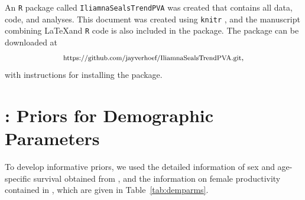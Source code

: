 \documentclass[]{risa}\usepackage[]{graphicx}\usepackage[]{color}
\begin{document}
 An \texttt{R} \citep{R:Deve:Core:ALan:2017} package called \texttt{IliamnaSealsTrendPVA} was created that contains all data, code, and analyses. This document was created using \texttt{knitr} \citep{Yihu:impl:2014,Yihu:dyna:2015,Yihu:knit:2016}, and the manuscript combining \LaTeX and \texttt{R} code is also included in the package. The package can be downloaded at 
 \[
 \footnotesize
 \textrm{https://github.com/jayverhoef/IliamnaSealsTrendPVA.git},
 \] 
 with instructions for installing the package.






\appendix

\section{:\hspace{2pt} Priors for Demographic Parameters}
\setcounter{table}{0}
\renewcommand{\thetable}{A\Roman{table}}

To develop informative priors, we used the detailed information of sex and age-specific survival obtained from \citet{Hast:Smal:Pend:sex:2012}, and the information on female productivity contained in \citet{Pitc:Calk:biol:1979}, which are given in Table~\ref{tab:demparms}.
\end{document}

